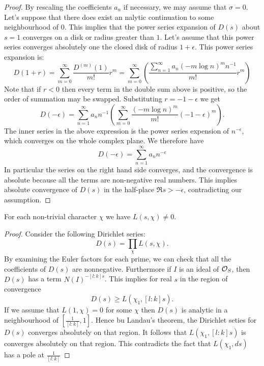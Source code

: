 \begin{proof}
	By rescaling the coefficients $a_n$ if necessary, we may assume that $\sigma=0$.
	Let's suppose that there does exist an nalytic continuation to some neighbourhood of $0$.
	This implies that the power series expansion of $D(s)$ about $s=1$ converges on a disk or radius
	greater than $1$. Let's assume that this power series converges absolutely one the closed
	disk of radius $1+\epsilon$.
	This power series expansion is:
	\[
		D(1+r)
		= \sum_{m=0}^\infty \frac{D^{(m)}(1)}{m!} r^m
		= \sum_{m=0}^\infty \left(\frac{\sum_{n=1}^\infty a_n (-m \log n )^m n^{-1}}{m!} r^m\right)
	\]
	Note that if $r < 0$ then every term in the double sum above is positive, so the order of
	summation may be swapped.
	Substituting $r = -1-\epsilon$ we get
	\[
		D(-\epsilon)
		=\sum_{n=1}^\infty a_n n^{-1}
		\left(\sum_{m=0}^\infty  \frac{(-m \log n )^m }{m!} (-1-\epsilon)^m\right).
	\]
	The inner series in the above expression is the power series expension of $n^{-\epsilon}$,
	which converges on the whole complex plane.
	We therefore have
	\[
		D(-\epsilon)
		=\sum_{n=1}^\infty a_n n^{-\epsilon}
	\]
	In particular the series on the right hand side converges,
	and the convergence is absolute because all the terms are non-negative real numbers.
	This implies absolute convergence of $D(s)$ in the half-place $\Re s > -\epsilon$, contradicting
	our assumption.
\end{proof}


\begin{theorem}
	For each non-trivial character $\chi$ we have $L(s,\chi) \ne 0$.
\end{theorem}

\begin{proof}
	Consider the following Dirichlet series:
	\[
		D(s) = \prod_\chi L(s,\chi).
	\]
	By examining the Euler factors for each prime, we can check that all the coefficients
	of $D(s)$ are nonnegative.
	Furthermore if $I$ is an ideal of ${\mathcal O}_S$, then $D(s)$ has a term $N(I)^{-[l:k] s}$.
	This implies for real $s$ in the region of convergence
	\[
		D(s) \ge L(\chi_1,[l:k]s).
	\]
	If we assume that $L(1,\chi)=0$ for some $\chi$ then $D(s)$ is analytic
	in a neighbourhood of $[\frac{1}{[l:k]},1]$.
	Hence bu Landau's theorem, the Dirichlet seties for $D(s)$ converges absolutely on that region.
	It follows that $L(\chi_1, [l:k]s)$ is converges absolutely on that region.
	This contradicts the fact that $L(\chi_1, ds)$ has a pole at $\frac{1}{[l:k]}$
\end{proof}






